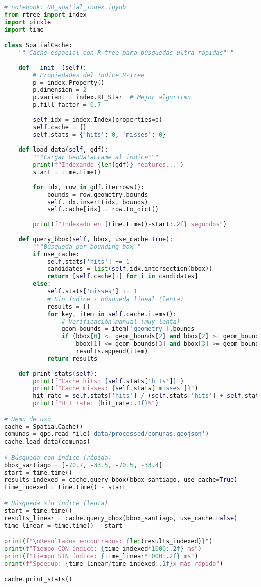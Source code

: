 \documentclass[11pt,a4paper]{article}
\begin{document}
\begin{lstlisting}[language=Python]
# notebook: 08_spatial_index.ipynb
from rtree import index
import pickle
import time

class SpatialCache:
    """Cache espacial con R-tree para búsquedas ultra-rápidas"""
    
    def __init__(self):
        # Propiedades del índice R-tree
        p = index.Property()
        p.dimension = 2
        p.variant = index.RT_Star  # Mejor algoritmo
        p.fill_factor = 0.7
        
        self.idx = index.Index(properties=p)
        self.cache = {}
        self.stats = {'hits': 0, 'misses': 0}
    
    def load_data(self, gdf):
        """Cargar GeoDataFrame al índice"""
        print(f"Indexando {len(gdf)} features...")
        start = time.time()
        
        for idx, row in gdf.iterrows():
            bounds = row.geometry.bounds
            self.idx.insert(idx, bounds)
            self.cache[idx] = row.to_dict()
        
        print(f"Indexado en {time.time()-start:.2f} segundos")
    
    def query_bbox(self, bbox, use_cache=True):
        """Búsqueda por bounding box"""
        if use_cache:
            self.stats['hits'] += 1
            candidates = list(self.idx.intersection(bbox))
            return [self.cache[i] for i in candidates]
        else:
            self.stats['misses'] += 1
            # Sin índice - búsqueda lineal (lenta)
            results = []
            for key, item in self.cache.items():
                # Verificación manual (muy lenta)
                geom_bounds = item['geometry'].bounds
                if (bbox[0] <= geom_bounds[2] and bbox[2] >= geom_bounds[0] and
                    bbox[1] <= geom_bounds[3] and bbox[3] >= geom_bounds[1]):
                    results.append(item)
            return results
    
    def print_stats(self):
        print(f"Cache hits: {self.stats['hits']}")
        print(f"Cache misses: {self.stats['misses']}")
        hit_rate = self.stats['hits'] / (self.stats['hits'] + self.stats['misses']) * 100
        print(f"Hit rate: {hit_rate:.1f}%")

# Demo de uso
cache = SpatialCache()
comunas = gpd.read_file('data/processed/comunas.geojson')
cache.load_data(comunas)

# Búsqueda con índice (rápida)
bbox_santiago = [-70.7, -33.5, -70.5, -33.4]
start = time.time()
results_indexed = cache.query_bbox(bbox_santiago, use_cache=True)
time_indexed = time.time() - start

# Búsqueda sin índice (lenta) 
start = time.time()
results_linear = cache.query_bbox(bbox_santiago, use_cache=False)
time_linear = time.time() - start

print(f"\nResultados encontrados: {len(results_indexed)}")
print(f"Tiempo CON índice: {time_indexed*1000:.2f} ms")
print(f"Tiempo SIN índice: {time_linear*1000:.2f} ms")
print(f"Speedup: {time_linear/time_indexed:.1f}x más rápido")

cache.print_stats()
\end{lstlisting}
\end{document}
